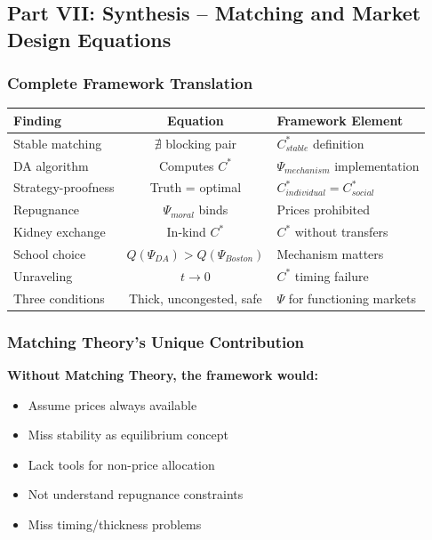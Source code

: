 \subsection{Part VII: Synthesis – Matching and Market Design Equations}

\subsubsection{Complete Framework Translation}

\begin{center}
\renewcommand{\arraystretch}{1.5}
\begin{tabular}{|l|c|l|}
\hline
\textbf{Finding} & \textbf{Equation} & \textbf{Framework Element} \\
\hline
Stable matching & $\nexists$ blocking pair & $C^*_{stable}$ definition \\
\hline
DA algorithm & Computes $C^*$ & $\Psi_{mechanism}$ implementation \\
\hline
Strategy-proofness & Truth = optimal & $C^*_{individual} = C^*_{social}$ \\
\hline
Repugnance & $\Psi_{moral}$ binds & Prices prohibited \\
\hline
Kidney exchange & In-kind $C^*$ & $C^*$ without transfers \\
\hline
School choice & $Q(\Psi_{DA}) > Q(\Psi_{Boston})$ & Mechanism matters \\
\hline
Unraveling & $t \to 0$ & $C^*$ timing failure \\
\hline
Three conditions & Thick, uncongested, safe & $\Psi$ for functioning markets \\
\hline
\end{tabular}
\end{center}

\subsubsection{Matching Theory's Unique Contribution}

\textbf{Without Matching Theory, the framework would:}
\begin{itemize}
    \item Assume prices always available
    \item Miss stability as equilibrium concept
    \item Lack tools for non-price allocation
    \item Not understand repugnance constraints
    \item Miss timing/thickness problems
\end{itemize}

